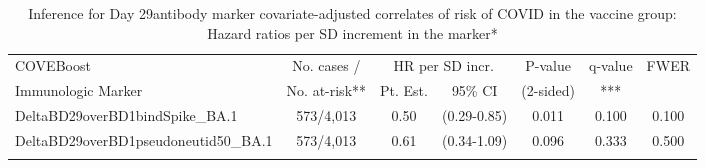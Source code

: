 \begin{longtable}{lcccccc}
\caption{Inference for Day 29antibody marker covariate-adjusted correlates of risk of COVID in the vaccine group: Hazard ratios per SD increment in the marker*} \\ 
   \hline
 
         \multicolumn{1}{l}{COVEBoost} & \multicolumn{1}{c}{No. cases /}   & \multicolumn{2}{c}{HR per SD incr.}                     & \multicolumn{1}{c}{P-value}   & \multicolumn{1}{c}{q-value}   & \multicolumn{1}{c}{FWER} \\ 
         \multicolumn{1}{l}{Immunologic Marker}            & \multicolumn{1}{c}{No. at-risk**} & \multicolumn{1}{c}{Pt. Est.} & \multicolumn{1}{c}{95\% CI} & \multicolumn{1}{c}{(2-sided)} & \multicolumn{1}{c}{***} & \multicolumn{1}{c}{} \\ 
         \hline
 
    DeltaBD29overBD1bindSpike\_BA.1 & 573/4,013 & 0.50 & (0.29-0.85) & 0.011 & 0.100 & 0.100 \\ 
  DeltaBD29overBD1pseudoneutid50\_BA.1 & 573/4,013 & 0.61 & (0.34-1.09) & 0.096 & 0.333 & 0.500 \\ 
   \hline
\hline
\label{tab:CoR_univariable_svycoxph_pretty_scaled}
\end{longtable}
